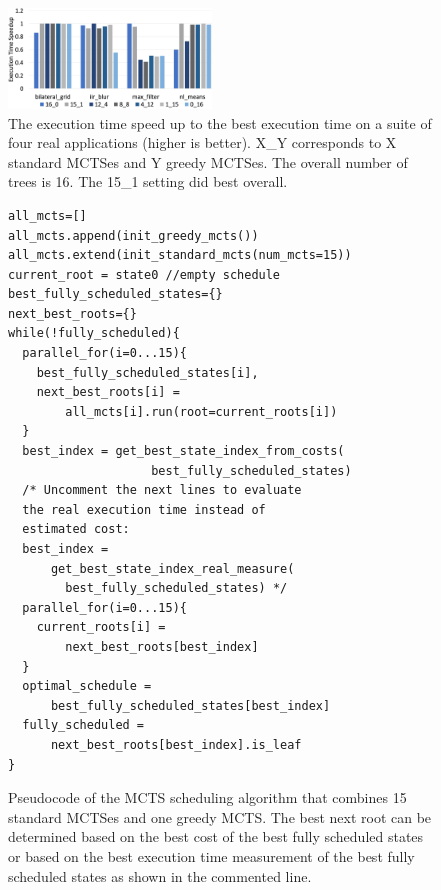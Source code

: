 \begin{figure}[!t]
    \centering
    \includegraphics[width=0.48\textwidth]{figures/random_greedy4.png}
    \caption{The execution time speed up to the best execution time on a suite of four real applications (higher is better). X\_Y corresponds to X standard MCTSes and Y greedy MCTSes. The overall number of trees is 16. The 15\_1 setting did best overall.}
    \label{fig:random_greedy}
\end{figure}
\begin{figure}[!t]
    \centering
\begin{verbatim}
all_mcts=[]
all_mcts.append(init_greedy_mcts())
all_mcts.extend(init_standard_mcts(num_mcts=15))
current_root = state0 //empty schedule
best_fully_scheduled_states={}
next_best_roots={}
while(!fully_scheduled){
  parallel_for(i=0...15){
    best_fully_scheduled_states[i], 
    next_best_roots[i] =  
        all_mcts[i].run(root=current_roots[i])
  }
  best_index = get_best_state_index_from_costs(
                    best_fully_scheduled_states)
  /* Uncomment the next lines to evaluate
  the real execution time instead of
  estimated cost:
  best_index = 
      get_best_state_index_real_measure(
        best_fully_scheduled_states) */
  parallel_for(i=0...15){
    current_roots[i] = 
        next_best_roots[best_index]
  }
  optimal_schedule = 
      best_fully_scheduled_states[best_index]
  fully_scheduled = 
      next_best_roots[best_index].is_leaf
}
\end{verbatim}
    \caption{Pseudocode of the MCTS scheduling algorithm that combines 15 standard MCTSes and one greedy MCTS. The best next root can be determined based on the best cost of the best fully scheduled states or based on the best execution time measurement of the best fully scheduled states as shown in the commented line.}
    \label{fig:mcts_algo}
\end{figure}


